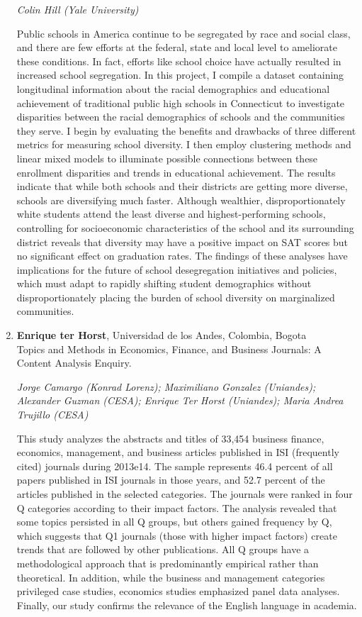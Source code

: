 \begin{enumerate}
\emph{\footnotesize Colin Hill (Yale University)}

Public schools in America continue to be segregated by race and social class, and there are few efforts at the federal, state and local level to ameliorate these conditions. In fact, efforts like school choice have actually resulted in increased school segregation. In this project, I compile a dataset containing longitudinal information about the racial demographics and educational achievement of traditional public high schools in Connecticut to investigate disparities between the racial demographics of schools and the communities they serve. I begin by evaluating the benefits and drawbacks of three different metrics for measuring school diversity. I then employ clustering methods and linear mixed models to illuminate possible connections between these enrollment disparities and trends in educational achievement. The results indicate that while both schools and their districts are getting more diverse, schools are diversifying much faster. Although wealthier, disproportionately white students attend the least diverse and highest-performing schools, controlling for socioeconomic characteristics of the school and its surrounding district reveals that diversity may have a positive impact on SAT scores but no significant effect on graduation rates. The findings of these analyses have implications for the future of school desegregation initiatives and policies, which must adapt to rapidly shifting student demographics without disproportionately placing the burden of school diversity on marginalized communities.

\item \textbf{Enrique ter Horst}, Universidad de los Andes, Colombia, Bogota \\
Topics and Methods in Economics, Finance, and Business Journals: A Content Analysis Enquiry.

\emph{\footnotesize Jorge Camargo (Konrad Lorenz); Maximiliano Gonzalez (Uniandes); Alexander Guzman (CESA); Enrique Ter Horst (Uniandes); Maria Andrea Trujillo (CESA)}

This study analyzes the abstracts and titles of 33,454 business finance, economics, management, and business articles published in ISI (frequently cited) journals during 2013e14. The sample represents 46.4 percent of all papers published in ISI journals in those years, and 52.7 percent of the articles published in the selected categories. The journals were ranked in four Q categories according to their impact factors. The analysis revealed that some topics persisted in all Q groups, but others gained frequency by Q, which suggests that Q1 journals (those with higher impact factors) create trends that are followed by other publications. All Q groups have a methodological approach that is predominantly empirical rather than theoretical. In addition, while the business and management categories privileged case studies, economics studies emphasized panel data analyses. Finally, our study confirms the relevance of the English language in academia.


\end{enumerate}
